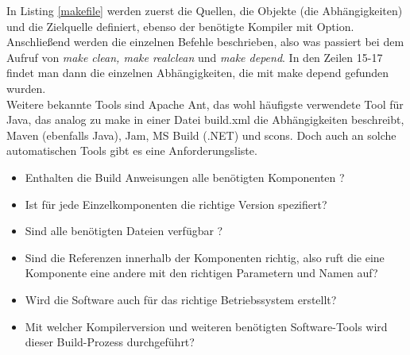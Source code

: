 In Listing \ref{makefile} werden zuerst die Quellen, die Objekte (die Abhängigkeiten) und die Zielquelle definiert, ebenso der benötigte Kompiler mit Option.
Anschließend werden die einzelnen Befehle beschrieben, also was passiert bei dem Aufruf von \textit{make clean, make realclean} und \textit{make depend}. In den Zeilen 15-17 findet man dann die einzelnen Abhängigkeiten, die mit make depend gefunden wurden.
\\
Weitere bekannte Tools sind Apache Ant, das wohl häufigste verwendete Tool für Java, das analog zu make in einer Datei build.xml die Abhängigkeiten beschreibt, Maven (ebenfalls Java), Jam, MS Build (.NET) und scons.
Doch auch an solche automatischen Tools gibt es eine Anforderungsliste. 
\cite{bib:se}
\begin{itemize}
\item Enthalten die Build Anweisungen alle benötigten Komponenten ?
\item Ist für jede Einzelkomponenten die richtige Version spezifiert?
\item Sind alle benötigten Dateien verfügbar ?
\item Sind die Referenzen innerhalb der Komponenten richtig, also ruft die eine Komponente eine andere mit den richtigen Parametern und Namen auf?
\item Wird die Software auch für das richtige Betriebssystem erstellt?
\item Mit welcher Kompilerversion und weiteren benötigten Software-Tools wird dieser Build-Prozess durchgeführt? 	
\end{itemize}

